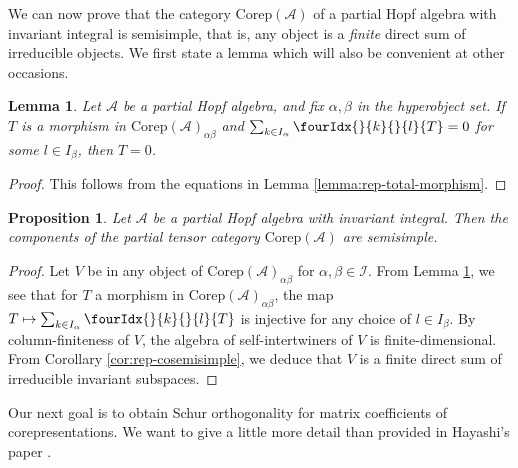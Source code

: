\documentclass[10pt]{article}
\newcommand{\Corep}{\mathrm{Corep}}
\newcommand{\Gr}[5]{\fourIdx{#2}{#4}{#3}{#5}{#1}}%
\newcommand{\Gru}[3]{\Gr{#1}{}{}{#2}{#3}}
\newtheorem{Lem}[Theorem]{Lemma}
\newtheorem{Prop}[Theorem]{Proposition}
\theoremstyle{definition}
\numberwithin{equation}{section}
\begin{document}
We can now prove that the category $\Corep(\mathscr{A})$ of a partial Hopf algebra with invariant integral is semisimple, that is, any object is a \emph{finite} direct sum of irreducible objects. We first state a lemma which will also be convenient at other occasions.

\begin{Lem}\label{LemInjMor}  Let $\mathscr{A}$ be a partial Hopf algebra, and fix $\alpha,\beta$ in the hyperobject set.  If $T$ is a morphism in $\Corep(\mathscr{A})_{\alpha\beta}$ and $\sum_{k\in I_\alpha} \Gru{T}{k}{l}=0$ for some $l \in I_\beta$, then $T=0$.
\end{Lem} 

\begin{proof} This follows from the equations in Lemma \ref{lemma:rep-total-morphism}.
\end{proof}

\begin{Prop}\label{prop:rep-cosemisimple} Let $\mathscr{A}$ be a partial Hopf algebra with invariant integral.   Then the components of the partial tensor category $\Corep(\mathscr{A})$ are semisimple.
\end{Prop}
\begin{proof} 

Let $V$ be in any object of $\Corep(\mathscr{A})_{\alpha\beta}$ for $\alpha,\beta\in \mathscr{I}$.  From Lemma \ref{LemInjMor}, we see that for $T$ a morphism in $\Corep(\mathscr{A})_{\alpha\beta}$, the map $T\mapsto \sum_{k\in I_\alpha} \Gru{T}{k}{l}$ is injective for any choice of $l\in I_\beta$. By column-finiteness of $V$, the algebra of self-intertwiners of $V$ is finite-dimensional. From Corollary \ref{cor:rep-cosemisimple}, we deduce that $V$ is a finite direct sum of irreducible invariant subspaces.
\end{proof} 


Our next goal is to obtain Schur orthogonality for matrix coefficients of corepresentations. We want to give a little more detail than provided in Hayashi's paper \cite{Hay1}.
\end{document}
